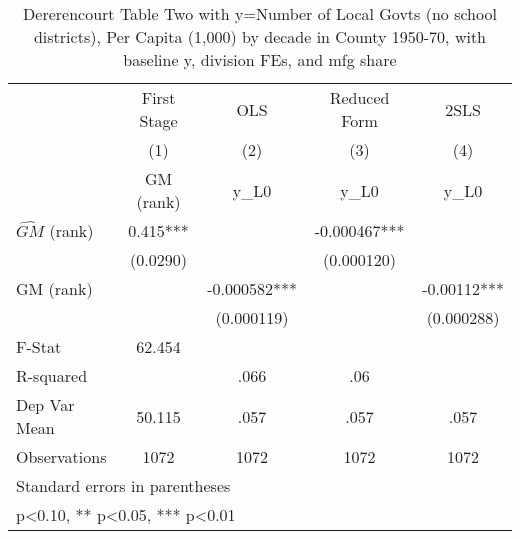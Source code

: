 \begin{table}[htbp]\centering
\def\sym#1{\ifmmode^{#1}\else\(^{#1}\)\fi}
\caption{Dererencourt Table Two with y=Number of Local Govts (no school districts), Per Capita (1,000) by decade in County 1950-70, with baseline y, division FEs, and mfg share}
\begin{tabular}{l*{4}{c}}
\toprule
                    & First Stage   &         OLS   &Reduced Form   &        2SLS   \\
                    &\multicolumn{1}{c}{(1)}&\multicolumn{1}{c}{(2)}&\multicolumn{1}{c}{(3)}&\multicolumn{1}{c}{(4)}\\
                    &\multicolumn{1}{c}{GM  (rank)}&\multicolumn{1}{c}{y\_L0}&\multicolumn{1}{c}{y\_L0}&\multicolumn{1}{c}{y\_L0}\\
\midrule
$\hat{GM}$ (rank)   &       0.415***&               &   -0.000467***&               \\
                    &    (0.0290)   &               &  (0.000120)   &               \\
\addlinespace
GM  (rank)          &               &   -0.000582***&               &    -0.00112***\\
                    &               &  (0.000119)   &               &  (0.000288)   \\
\midrule
F-Stat              &      62.454   &               &               &               \\
R-squared           &               &        .066   &         .06   &               \\
Dep Var Mean        &      50.115   &        .057   &        .057   &        .057   \\
Observations        &        1072   &        1072   &        1072   &        1072   \\
\bottomrule
\multicolumn{5}{l}{\footnotesize Standard errors in parentheses}\\
\multicolumn{5}{l}{\footnotesize * p<0.10, ** p<0.05, *** p<0.01}\\
\end{tabular}
\end{table}
